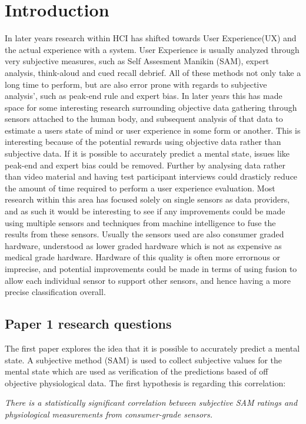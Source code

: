 \chapter{Introduction}
In later years research within HCI has shifted towards User Experience(UX) and the actual experience with a system.
User Experience is usually analyzed through very subjective measures, such as Self Assesment Manikin (SAM), expert analysis, think-aloud and cued recall debrief. 
All of these methods not only take a long time to perform, but are also error prone with regards to subjective analysis', such as peak-end rule and expert bias.
In later years this has made space for some interesting research surrounding objective data gathering through sensors attached to the human body, and subsequent analysis of that data to estimate a users state of mind or user experience in some form or another. 
This is interesting because of the potential rewards using objective data rather than subjective data. 
If it is possible to accurately predict a mental state, issues like peak-end and expert bias could be removed. 
Further by analysing data rather than video material and having test participant interviews could drasticly reduce the amount of time required to perform a user experience evaluation. 
Most research within this area has focused solely on single sensors as data providers, and as such it would be interesting to see if any improvements could be made using multiple sensors and techniques from machine intelligence to fuse the results from these sensors. 
Usually the sensors used are also consumer graded hardware, understood as lower graded hardware which is not as expensive as medical grade hardware. 
Hardware of this quality is often more errornous or imprecise, and potential improvements could be made in terms of using fusion to allow each individual sensor to support other sensors, and hence having a more precise classification overall.

\section{Paper 1 research questions}
The first paper explores the idea that it is possible to accurately predict a mental state. A subjective method (SAM) is used to collect subjective values for the mental state which are used as verification of the predictions based of off objective physiological data. The first hypothesis is regarding this correlation:

\textit{There is a statistically significant correlation between subjective SAM ratings and physiological measurements from consumer-grade sensors.}\\\\

